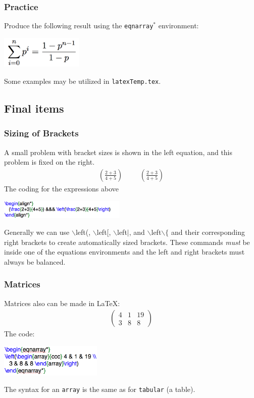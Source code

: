 \begin{frame} \frametitle{Practice}
Produce the following result using the \texttt{\color{highlight}eqnarray$^*$} environment:
\begin{center}
   \includegraphics[height=0.6in]{math/tryIt3}
\end{center}
Some examples may be utilized in \texttt{\color{highlight}latexTemp.tex}.
\end{frame}

\subsection[Final items]{Final items}
\begin{frame} \frametitle{Sizing of Brackets}
A small problem with bracket sizes is shown in the left equation, and this problem is fixed on the right.
\begin{align*}
   (\frac{2+3}{4+5}) &&& \left(\frac{2+3}{4+5}\right)
\end{align*}
The coding for the expressions above 
\begin{center}
\includegraphics[height=9mm]{math/fixingParentheses}
\end{center}
Generally we can use {\color{command}$\backslash$left\color{black}(}, {\color{command}$\backslash$left\color{black}[}, {\color{command}$\backslash$left\color{black}$|$}, and {\color{command}$\backslash$left$\backslash\{$} and their corresponding right brackets to create automatically sized brackets. These commands \emph{must} be inside one of the equations environments and the left and right brackets must always be balanced.
\end{frame}

\begin{frame} \frametitle{Matrices}
Matrices also can be made in LaTeX:
\begin{eqnarray*}
\left(\begin{array}{ccc} 4 & 1 & 19 \\ 3 & 8 & 8\end{array}\right)
\end{eqnarray*}
The code:
\begin{center}
\includegraphics[height=0.6in]{math/array}
\end{center}
The syntax for an \texttt{\color{highlight}array} is the same as for \texttt{\color{highlight}tabular} (a table).
\end{frame}

